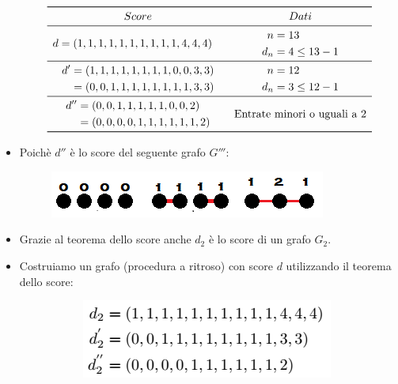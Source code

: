 \documentclass[10pt]{article}
\begin{document}
\begin{itemize}
	\[
	\begin{array}{cc}
		\toprule
		Score & Dati \\
		\midrule
		\begin{split} d &= (1,1,1,1,1,1,1,1,1,1,4,4,4) \end{split} & \begin{split} n &= 13 \\ d_n &= 4 \leq 13 -1 \end{split} \\
		\midrule
		\begin{split} d' &= (1,1,1,1,1,1,1,1,0,0,3,3) \\ &= (0,0,1,1,1,1,1,1,1,1,3,3) \end{split} & \begin{split} n &= 12 \\ d_n &= 3 \leq 12 -1 \end{split} \\
		\midrule
		\begin{split} d'' &= (0,0,1,1,1,1,1,0,0,2) \\ &= (0,0,0,0,1,1,1,1,1,1,2) \end{split} & \textrm{Entrate minori o uguali a 2} \\
		\bottomrule
	\end{array}
	\]
	\item
	Poichè $d''$ è lo score del seguente grafo $G'''$:
	\begin{center}
		\begin{figure}[h]
		\centering
		\includegraphics[width = 0.2\linewidth]{scoreGrafo_Esercizio5}
	\end{figure}
	\end{center}
	\item 
	Grazie al teorema dello score anche $d_2$ è lo score di un grafo $G_2$.
	\item
	Costruiamo un grafo (procedura a ritroso) con score $d$ utilizzando il teorema dello score:
	\begin{center}
		\begin{figure}[h]
		\centering
		\begin{subfigure}[b]{0.4\linewidth}
			\includegraphics[width=\linewidth]{scoreEsercizio5}

\end{subfigure}
\end{figure}
\end{center}
\end{itemize}
\end{document}
